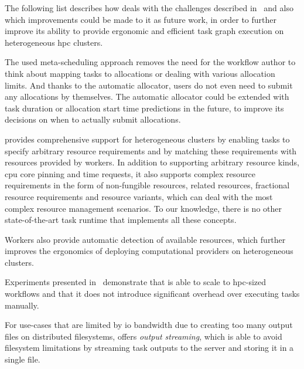 The following list describes how \hyperqueue{} deals with the challenges described
in~ and also which improvements could be made to it as future work, in order to
further improve its ability to provide ergonomic and efficient task graph execution on
heterogeneous \gls{hpc} clusters.
\begin{description}[wide=0pt]
	\item[Allocation manager] The used meta-scheduling approach removes the need for the workflow author to think about mapping
		tasks to allocations or dealing with various allocation limits. And thanks to the automatic
		allocator, users do not even need to submit any allocations by themselves. The automatic allocator
		could be extended with task duration or allocation start time predictions in the future, to improve
		its decisions on when to actually submit allocations.
	\item[Cluster heterogeneity] \hyperqueue{} provides comprehensive support for heterogeneous
		clusters by enabling tasks to specify arbitrary resource requirements and by matching these
		requirements with resources provided by workers. In addition to supporting arbitrary resource
		kinds, \gls{cpu} core pinning and time requests, it also supports complex resource
		requirements in the form of non-fungible resources, related resources, fractional resource
		requirements and resource variants, which can deal with the most complex resource management
		scenarios. To our knowledge, there is no other state-of-the-art task runtime that
		implements all these concepts.

		Workers also provide automatic detection of available
		resources, which further improves the ergonomics of deploying computational providers on
		heterogeneous clusters.
	\item[Performance and scalability] Experiments presented in~ demonstrate that \hyperqueue{} is
		able to scale to \gls{hpc}-sized workflows and that it does not introduce
		significant overhead over executing tasks manually.

		For use-cases that are limited by \gls{io} bandwidth due to creating too many
		output files on distributed filesystems, \hyperqueue{} offers
		\emph{output streaming}, which is able to avoid filesystem limitations by streaming task outputs
		to the server and storing it in a single file.


\end{description}

